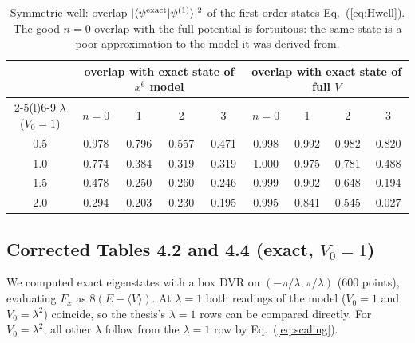 \documentclass[11pt,a4paper]{article}
\newcommand{\Eq}[1]{Eq.~(#1)}
\begin{document}
\begin{table}[h]
\centering\small
\begin{tabular}{@{}c cccc cccc@{}}
\toprule
& \multicolumn{4}{c}{overlap with exact state of $x^6$ model} & \multicolumn{4}{c}{overlap with exact state of full $V$}\\
\cmidrule(lr){2-5}\cmidrule(l){6-9}
$\lambda$ ($V_0=1$) & $n=0$ & 1 & 2 & 3 & $n=0$ & 1 & 2 & 3\\
\midrule
0.5 & 0.978 & 0.796 & 0.557 & 0.471 & 0.998 & 0.992 & 0.982 & 0.820\\
1.0 & 0.774 & 0.384 & 0.319 & 0.319 & 1.000 & 0.975 & 0.781 & 0.488\\
1.5 & 0.478 & 0.250 & 0.260 & 0.246 & 0.999 & 0.902 & 0.648 & 0.194\\
2.0 & 0.294 & 0.203 & 0.230 & 0.195 & 0.995 & 0.841 & 0.545 & 0.027\\
\bottomrule
\end{tabular}
\caption{Symmetric well: overlap $|\langle\psi^{\rm exact}|\psi^{(1)}\rangle|^2$ of the first-order
states \Eq{\ref{eq:Hwell}}. The good $n=0$ overlap with the full potential is fortuitous: the
same state is a poor approximation to the model it was derived from.}
\label{tab:wfid}
\end{table}

\subsection{Corrected Tables 4.2 and 4.4 (exact, $V_0=1$)}
We computed exact eigenstates with a box DVR on $(-\pi/\lambda,\pi/\lambda)$ (600 points),
evaluating $F_x$ as $8(E-\langle V\rangle)$. At $\lambda=1$ both readings of the model ($V_0=1$
and $V_0=\lambda^2$) coincide, so the thesis's $\lambda=1$ rows can be compared directly. For
$V_0=\lambda^2$, all other $\lambda$ follow from the $\lambda=1$ row by \Eq{\ref{eq:scaling}}.
\end{document}
